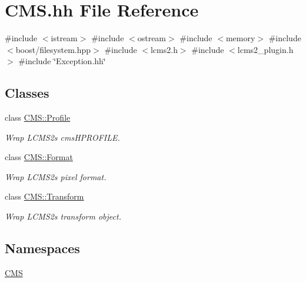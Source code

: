 \hypertarget{_c_m_s_8hh}{}\section{C\+M\+S.\+hh File Reference}
\label{_c_m_s_8hh}
{\ttfamily \#include $<$istream$>$}\newline
{\ttfamily \#include $<$ostream$>$}\newline
{\ttfamily \#include $<$memory$>$}\newline
{\ttfamily \#include $<$boost/filesystem.\+hpp$>$}\newline
{\ttfamily \#include $<$lcms2.\+h$>$}\newline
{\ttfamily \#include $<$lcms2\+\_\+plugin.\+h$>$}\newline
{\ttfamily \#include \char`\"{}Exception.\+hh\char`\"{}}\newline
\subsection*{Classes}
\begin{DoxyCompactItemize}
\item 
class \hyperlink{class_c_m_s_1_1_profile}{C\+M\+S\+::\+Profile}
\begin{DoxyCompactList}\small\item\em Wrap L\+C\+M\+S2\textquotesingle{}s cms\+H\+P\+R\+O\+F\+I\+LE. \end{DoxyCompactList}\item 
class \hyperlink{class_c_m_s_1_1_format}{C\+M\+S\+::\+Format}
\begin{DoxyCompactList}\small\item\em Wrap L\+C\+M\+S2\textquotesingle{}s pixel format. \end{DoxyCompactList}\item 
class \hyperlink{class_c_m_s_1_1_transform}{C\+M\+S\+::\+Transform}
\begin{DoxyCompactList}\small\item\em Wrap L\+C\+M\+S2\textquotesingle{}s transform object. \end{DoxyCompactList}\end{DoxyCompactItemize}
\subsection*{Namespaces}
\begin{DoxyCompactItemize}
\item 
 \hyperlink{namespace_c_m_s}{C\+MS}
\end{DoxyCompactItemize}
